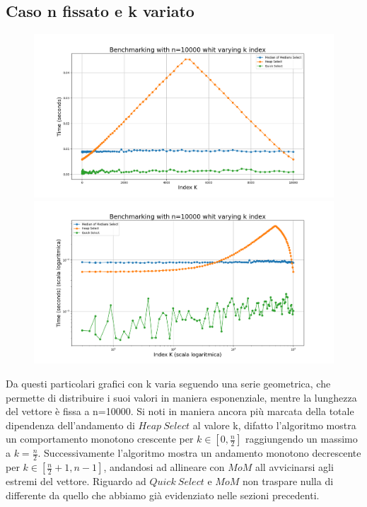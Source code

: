 \documentclass[a4paper]{article}
\begin{document}
\subsection{Caso n fissato e k variato}
\begin{figure}[h]
    \centering
    \includegraphics[width=.83\textwidth]{graphs/n_fixed_n.png}
    \includegraphics[width=.83\textwidth]{graphs/n_fixed_2xlog.png}
\end{figure}
Da questi particolari grafici con k varia seguendo una serie geometrica, che permette di distribuire i suoi valori in maniera esponenziale, mentre la lunghezza del vettore è fissa a n=10000. Si noti in maniera ancora più marcata della totale dipendenza dell'andamento di $Heap\ Select$ al valore k, difatto l'algoritmo mostra un comportamento monotono crescente per $k\in[0,\frac{n}{2}]$ raggiungendo un massimo a $k=\frac{n}{2}$. 
Successivamente l'algoritmo mostra un andamento monotono decrescente per $k\in[\frac{n}{2}+1,n-1]$, andandosi ad allineare con $MoM$ all avvicinarsi agli estremi del vettore. Riguardo ad $Quick\ Select$ e $MoM$ non traspare nulla di differente da quello che abbiamo già evidenziato nelle sezioni precedenti.\\
\newpage
\end{document}
